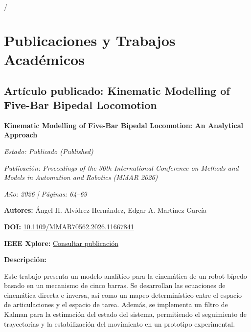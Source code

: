 \newpage
{}
{}

/
\newpage
{}
{}

\section*{Publicaciones y Trabajos Académicos}

{}

\subsection*{Artículo publicado: Kinematic Modelling of Five-Bar Bipedal Locomotion}

\textbf{Kinematic Modelling of Five-Bar Bipedal Locomotion: An Analytical Approach}

\vspace{0.3cm}

\textit{Estado: Publicado (Published)}

\textit{Publicación: Proceedings of the 30th International Conference on Methods and Models in Automation and Robotics (MMAR 2026)}

\textit{Año: 2026 \quad | \quad Páginas: 64--69}

\vspace{0.3cm}

\textbf{Autores:} Ángel H. Alvídrez-Hernández, Edgar A. Martínez-García

\vspace{0.3cm}

\textbf{DOI:} \href{https://doi.org/10.1109/MMAR70562.2026.11667841}{10.1109/MMAR70562.2026.11667841}

\textbf{IEEE Xplore:} \href{https://ieeexplore.ieee.org/document/11667841}{Consultar publicación}

\vspace{0.5cm}

\textbf{Descripción:}

Este trabajo presenta un modelo analítico para la cinemática de un robot bípedo basado en un mecanismo de cinco barras. Se desarrollan las ecuaciones de cinemática directa e inversa, así como un mapeo determinístico entre el espacio de articulaciones y el espacio de tarea. Además, se implementa un filtro de Kalman para la estimación del estado del sistema, permitiendo el seguimiento de trayectorias y la estabilización del movimiento en un prototipo experimental.

\vspace{0.7cm}


